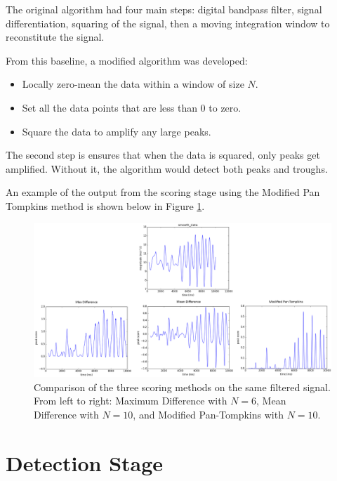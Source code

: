                 The original algorithm had four main steps: digital bandpass filter, signal differentiation, squaring of the signal, then a moving integration window to reconstitute the signal.

                From this baseline, a modified algorithm was developed:

                \begin{itemize}
                    \item Locally zero-mean the data within a window of size $N$.
                    \item Set all the data points that are less than 0 to zero.
                    \item Square the data to amplify any large peaks.
                \end{itemize}

                The second step is ensures that when the data is squared, only peaks get amplified. Without it, the algorithm would detect both peaks and troughs.

                An example of the output from the scoring stage using the Modified Pan Tompkins method is shown below in Figure \ref{img_compare_scoring}.

                \begin{figure}[!th]
                    \includegraphics[width=\textwidth]{Images/compare_scoring.png}
                    \centering
                    \caption{Comparison of the three scoring methods on the same filtered signal. From left to right: Maximum Difference with $N=6$, Mean Difference with $N=10$, and Modified Pan-Tompkins with $N=10$.}
                    \label{img_compare_scoring}
                \end{figure}


        \section{Detection Stage}

